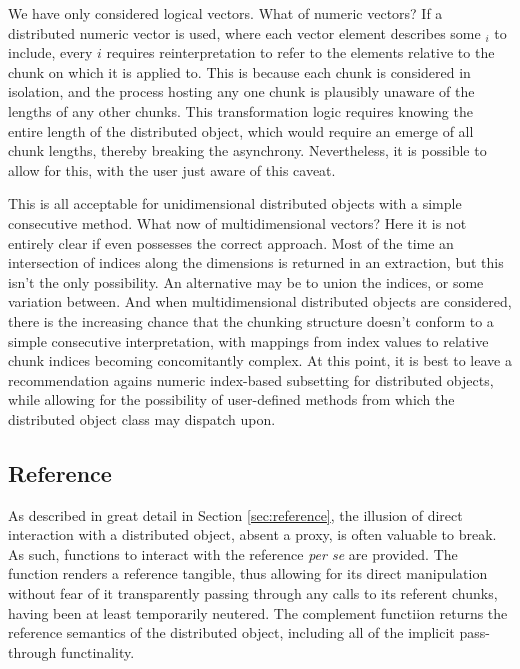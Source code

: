 We have only considered logical vectors.
What of numeric vectors?
If a distributed numeric vector is used, where each vector element describes some $_i$ to include, every $i$ requires reinterpretation to refer to the elements relative to the chunk on which it is applied to.
This is because each chunk is considered in isolation, and the process hosting any one chunk is plausibly unaware of the lengths of any other chunks.
This transformation logic requires knowing the entire length of the distributed object, which would require an emerge of all chunk lengths, thereby breaking the asynchrony.
Nevertheless, it is possible to allow for this, with the user just aware of this caveat.

This is all acceptable for unidimensional distributed objects with a simple consecutive  method.
What now of multidimensional vectors?
Here it is not entirely clear if \R even possesses the correct approach.
Most of the time an intersection of indices along the dimensions is returned in an extraction, but this isn't the only possibility.
An alternative may be to union the indices, or some variation between.
And when multidimensional distributed objects are considered, there is the increasing chance that the chunking structure doesn't conform to a simple consecutive interpretation, with mappings from index values to relative chunk indices becoming concomitantly complex.
At this point, it is best to leave a recommendation agains numeric index-based subsetting for distributed objects, while allowing for the possibility of user-defined methods from which the distributed object class may dispatch upon.

\subsection{Reference}

As described in great detail in Section \ref{sec:reference}, the illusion of direct interaction with a distributed object, absent a proxy, is often valuable to break.
As such, functions to interact with the reference \textit{per se} are provided.
The  function renders a reference tangible, thus allowing for its direct manipulation without fear of it transparently passing through any calls to its referent chunks, having been at least temporarily neutered.
The complement functiion  returns the reference semantics of the distributed object, including all of the implicit pass-through functinality.

